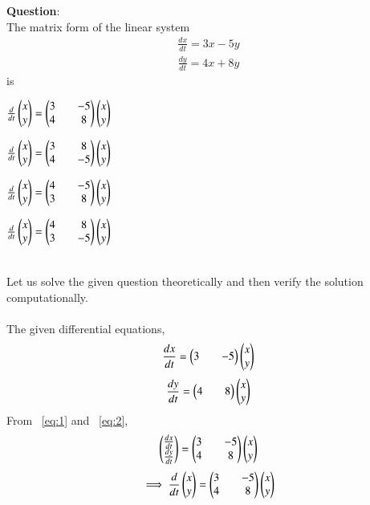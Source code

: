 \documentclass[journal]{IEEEtran}
\begin{document}
\textbf{Question}:\\
The matrix form of the linear system 
\begin{align*}
    \frac{dx}{dt}=3x-5y
\end{align*}
\begin{align*}
    \frac{dy}{dt}=4x+8y
\end{align*}
is
\begin{enumerate}
\begin{multicols}{2}
    \item $\frac{d}{dt}\begin{pmatrix}x\\y\end{pmatrix}=\begin{pmatrix}3&&-5\\4&&8\end{pmatrix}\begin{pmatrix}x\\y\end{pmatrix}$
    \item $\frac{d}{dt}\begin{pmatrix}x\\y\end{pmatrix}=\begin{pmatrix}3&&8\\4&&-5\end{pmatrix}\begin{pmatrix}x\\y\end{pmatrix}$
    \item $\frac{d}{dt}\begin{pmatrix}x\\y\end{pmatrix}=\begin{pmatrix}4&&-5\\3&&8\end{pmatrix}\begin{pmatrix}x\\y\end{pmatrix}$
    \item $\frac{d}{dt}\begin{pmatrix}x\\y\end{pmatrix}=\begin{pmatrix}4&&8\\3&&-5\end{pmatrix}\begin{pmatrix}x\\y\end{pmatrix}$
\end{multicols}
\end{enumerate}
\solution \\
Let us solve the given question theoretically and then verify the solution computationally.\\
\\
The given differential equations,
\begin{align}
    \frac{dx}{dt}=\begin{pmatrix}3&&-5\end{pmatrix}\begin{pmatrix}x\\y\end{pmatrix} \label{eq:1}
\end{align}
\begin{align}
    \frac{dy}{dt}=\begin{pmatrix}4&&8\end{pmatrix}\begin{pmatrix}x\\y\end{pmatrix} \label{eq:2}
\end{align}
From ~\eqref{eq:1} and ~\eqref{eq:2},
\begin{align}
    \begin{pmatrix}\frac{dx}{dt}\\\frac{dy}{dt}\end{pmatrix}=\begin{pmatrix}3&&-5\\4&&8\end{pmatrix}\begin{pmatrix}x\\y\end{pmatrix}
\end{align}
\begin{align}
    \implies \frac{d}{dt}\begin{pmatrix}x\\y\end{pmatrix}=\begin{pmatrix}3&&-5\\4&&8\end{pmatrix}\begin{pmatrix}x\\y\end{pmatrix}
\end{align}
\end{document}
